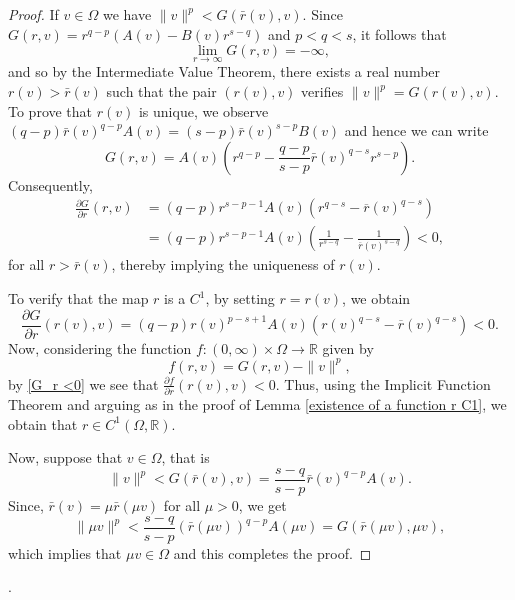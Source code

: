 \documentclass[12pt,reqno]{amsart}
\begin{document}
\begin{proof} If $v\in\Omega$ we have $\|v\|^p<G(\bar{r}(v),v)$. Since $G(r,v)=r^{q-p}\left(A(v)-B(v)r^{s-q}\right)$ and $p<q<s$, it follows that     
$$
\lim_{r\rightarrow \infty}G(r,v)=-\infty,
$$
 and so by the Intermediate Value Theorem, there exists a real number $r(v)>\bar{r}(v)$ such that the pair $(r(v),v)$ verifies $\|v\|^p=G(r(v),v)$. To prove that $r(v)$ is unique, we observe $(q-p)\bar{r}(v)^{q-p}A(v)=(s-p)\bar{r}(v)^{s-p}B(v)$ and hence we can write 
$$
G(r,v)=A(v)\left(r^{q-p}-\frac{q-p}{s-p}\bar{r}(v)^{q-s}r^{s-p}\right).
$$ 
Consequently, 
$$
\begin{aligned}
\frac{\partial G}{\partial r}(r,v)&=(q-p)r^{s-p-1} A(v)(r^{q-s}-\overline{r}(v)^{q-s})\\
&=(q-p)r^{s-p-1} A(v)\left(\frac{1}{r^{s-q}}-\frac{1}{\overline{r}(v)^{s-q}}\right)<0,
\end{aligned}
$$
for all $r>\bar{r}(v)$, thereby implying the uniqueness of $r(v)$.

To verify that the map $r$ is a $C^1$, by setting $r=r(v)$, we obtain
	\begin{equation}\label{G_r <0}
		\frac{\partial G}{\partial r}(r(v),v)=(q-p) r(v)^{p-s+1}A(v)(r(v)^{q-s}-\overline{r}(v)^{q-s})<0.
	\end{equation}
Now, considering the function $f:(0,\infty)\times \Omega\rightarrow \mathds{R}$ given by 
	\begin{equation*}
		f(r,v)=G(r,v)-\|v\|^p,
	\end{equation*}
by \eqref{G_r <0} we see that $\frac{\partial f}{\partial r}(r(v),v)<0$. Thus, using the Implicit Function Theorem and arguing as in the proof of Lemma \ref{existence of a function r C1}, we obtain that $r \in C^1(\Omega,\mathds{R})$.

Now, suppose that $v\in\Omega$, that is 
$$
\|v\|^p<G(\bar{r}(v),v)=\frac{s-q}{s-p}\bar{r}(v)^{q-p}A(v).
$$
Since, $\bar{r}(v)=\mu\bar{r}(\mu v)$ for all $\mu>0$, we get  	
$$
\|\mu v\|^p<\frac{s-q}{s-p}(\bar{r}(\mu v))^{q-p}A(\mu v)=G(\bar{r}(\mu v),\mu v),
$$
which implies that $\mu v\in\Omega$ and this completes the proof.
\end{proof}.
\end{document}
